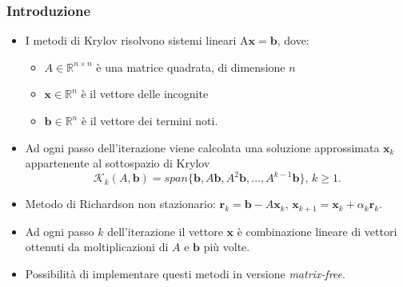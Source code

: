 \documentclass[10pt]{beamer}
\begin{document}
\begin{frame} \frametitle{Introduzione}
\begin{itemize}
    \item I metodi di Krylov risolvono sistemi lineari A$\mathbf{x}=\mathbf{b}$, dove:
    \begin{itemize}
    \item $A\in\mathbb{R}^{n\times n}$ è una matrice quadrata, di dimensione $n$
    \item $\mathbf{x}\in\mathbb{R}^{n}$ è il vettore delle incognite
    \item $\mathbf{b}\in\mathbb{R}^{n}$ è il vettore dei termini noti.
    \end{itemize}
    
    \item Ad ogni passo dell'iterazione viene calcolata una soluzione approssimata $\mathbf{x}_k$ appartenente al \alert{sottospazio di Krylov}
    $$\mathcal{K}_k(A,\mathbf{b})=span\{\mathbf{b},A\mathbf{b},A^2\mathbf{b},\dots,A^{k-1}\mathbf{b}\}\text{, } k\geq 1.$$
    
    \item Metodo di Richardson non stazionario: $\mathbf{r}_{k}=\mathbf{b}-A\mathbf{x}_{k}$, $\mathbf{x}_{k+1}=\mathbf{x}_k+\alpha_k\mathbf{r}_{k}.$
    
    
    \item Ad ogni passo $k$ dell'iterazione il vettore $\mathbf{x}$ è combinazione lineare di vettori ottenuti da moltiplicazioni di $A$ e $\mathbf{b}$ più volte.
    
    \item Possibilità di implementare questi metodi in versione \textit{matrix-free}.
    
\end{itemize}
\end{frame}
\end{document}
